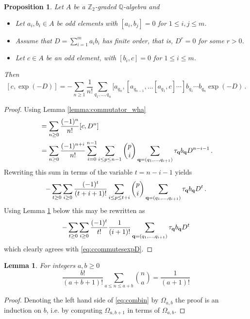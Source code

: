 \documentclass[english,letter paper,12pt,leqno]{article}
\newtheorem{proposition}[theorem]{Proposition}
\newtheorem{lemma}[theorem]{Lemma}
\theoremstyle{example}
\numberwithin{equation}{section}
\def\be{\begin{equation}}
\def\ee{\end{equation}}
\def\nZ{\mathds{Z}}
\def\nQ{\mathds{Q}}
\begin{document}
\begin{proposition}\label{prop:ccommutesexpD} Let $A$ be a $\nZ_2$-graded $\nQ$-algebra and
\begin{itemize}
\item Let $a_i, b_i \in A$ be odd elements with $[a_i,b_j] = 0$ for $1 \le i,j \le m$.
\item Assume that $D = \sum_{i=1}^m a_i b_i$ has finite order, that is, $D^r = 0$ for some $r > 0$.
\item Let $c \in A$ be an odd element, with $[b_i, c] = 0$ for $1 \le i \le m$.
\end{itemize}
Then
\be\label{eq:ccommutesexpD}
[c, \exp(-D)] = - \sum_{n \ge 1} \frac{1}{n!} \sum_{q_1,\ldots,q_n} [ a_{q_n}, [ a_{q_{n-1}}, \ldots [ a_{q_1}, c ] \cdots ] b_{q_1} \cdots b_{q_n} \exp(-D)\,.
\ee
\end{proposition}
\begin{proof}
Using Lemma \ref{lemma:commutator_wha}
\begin{align*}
[c, \exp(-D)] &= \sum_{n \ge 0} \frac{(-1)^n}{n!} [c, D^n]\\
&= \sum_{n \ge 0} \frac{(-1)^{n+i}}{n!} \sum_{i=0}^{n-1} \sum_{i \le p \le n -1} \binom{p}{i} \sum_{\bold{q} = (q_1,\ldots,q_{i+1})} \tau_{\bold{q}} b_{\bold{q}} D^{n-i-1}\,.
\end{align*}
Rewriting this sum in terms of the variable $t = n - i - 1$ yields
\[
- \sum_{t \ge 0} \sum_{i \ge 0} \frac{(-1)^{t}}{(t+i+1)!} \sum_{i \le p \le t+i}  \binom{p}{i} \sum_{\bold{q} = (q_1,\ldots,q_{i+1})} \tau_{\bold{q}} b_{\bold{q}} D^{t}\,.
\]
Using Lemma \ref{lemma:combin} below this may be rewritten as
\[
- \sum_{t \ge 0} \sum_{i \ge 0} \frac{(-1)^t}{t!} \frac{1}{(i+1)!} \sum_{\bold{q} = (q_1,\ldots,q_{i+1})} \tau_{\bold{q}} b_{\bold{q}} D^{t}
\]
which clearly agrees with \eqref{eq:ccommutesexpD}.
\end{proof}

\begin{lemma}\label{lemma:combin} For integers $a, b \ge 0$
\begin{equation}\label{eq:combin}
\frac{b!}{(a+b+1)!} \sum_{a \le n \le a + b} \binom{n}{a} = \frac{1}{(a+1)!}
\end{equation}
\end{lemma}
\begin{proof}
Denoting the left hand side of \eqref{eq:combin} by $\Omega_{a,b}$ the proof is an induction on $b$, i.e. by computing $\Omega_{a,b+1}$ in terms of $\Omega_{a,b}$.
\end{proof}
\end{document}

